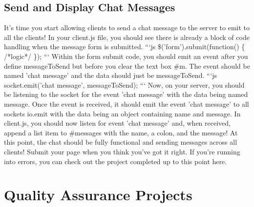 \documentclass{article}%
\begin{document}
%
\subsection{Send and Display Chat Messages}%
\label{subsec:SendandDisplayChatMessages}%
It's time you start allowing clients to send a chat message to the server to emit to all the clients! In your client.js file, you should see there is already a block of code handling when the message form is submitted.\newline%
```js\newline%
\$('form').submit(function() \{\newline%
  /*logic*/\newline%
\});\newline%
```\newline%
Within the form submit code, you should emit an event after you define messageToSend but before you clear the text box \#m. The event should be named 'chat message' and the data should just be messageToSend.\newline%
```js\newline%
socket.emit('chat message', messageToSend);\newline%
```\newline%
Now, on your server, you should be listening to the socket for the event 'chat message' with the data being named message. Once the event is received, it should emit the event 'chat message' to all sockets io.emit with the data being an object containing name and message.\newline%
In client.js, you should now listen for event 'chat message' and, when received, append a list item to \#messages with the name, a colon, and the message!\newline%
At this point, the chat should be fully functional and sending messages across all clients!\newline%
Submit your page when you think you've got it right. If you're running into errors, you can check out the project completed up to this point here.\newline%

%
\newpage%
\section{Quality Assurance Projects}%
\label{sec:QualityAssuranceProjects}%
\end{document}
